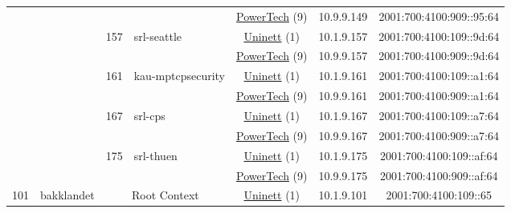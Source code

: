 \begin{small}
\begin{center}
\begin{longtable}{|c|c|c|c|c|c|c|c|}
  &  &  &  & \multicolumn{2}{|c|}{\tiny{\href{http://www.powertech.no}{PowerTech} (9)}} & \tiny{10.9.9.149} & \tiny{2001:700:4100:909::95:64} \\* \cline{3-3}\cline{4-4}\cline{5-5}\cline{6-6}\cline{7-7}\cline{8-8}
  &  & \multirow{2}{*}{\tiny{157}} & \multicolumn{1}{|l|}{\multirow{2}{*}{\tiny{srl-seattle}}} & \multicolumn{2}{|c|}{\tiny{\href{https://www.uninett.no}{Uninett} (1)}} & \tiny{10.1.9.157} & \tiny{2001:700:4100:109::9d:64} \\* \cline{5-5}\cline{6-6}\cline{7-7}\cline{8-8}
  &  &  &  & \multicolumn{2}{|c|}{\tiny{\href{http://www.powertech.no}{PowerTech} (9)}} & \tiny{10.9.9.157} & \tiny{2001:700:4100:909::9d:64} \\* \cline{3-3}\cline{4-4}\cline{5-5}\cline{6-6}\cline{7-7}\cline{8-8}
  &  & \multirow{2}{*}{\tiny{161}} & \multicolumn{1}{|l|}{\multirow{2}{*}{\tiny{kau-mptcpsecurity}}} & \multicolumn{2}{|c|}{\tiny{\href{https://www.uninett.no}{Uninett} (1)}} & \tiny{10.1.9.161} & \tiny{2001:700:4100:109::a1:64} \\* \cline{5-5}\cline{6-6}\cline{7-7}\cline{8-8}
  &  &  &  & \multicolumn{2}{|c|}{\tiny{\href{http://www.powertech.no}{PowerTech} (9)}} & \tiny{10.9.9.161} & \tiny{2001:700:4100:909::a1:64} \\* \cline{3-3}\cline{4-4}\cline{5-5}\cline{6-6}\cline{7-7}\cline{8-8}
  &  & \multirow{2}{*}{\tiny{167}} & \multicolumn{1}{|l|}{\multirow{2}{*}{\tiny{srl-cps}}} & \multicolumn{2}{|c|}{\tiny{\href{https://www.uninett.no}{Uninett} (1)}} & \tiny{10.1.9.167} & \tiny{2001:700:4100:109::a7:64} \\* \cline{5-5}\cline{6-6}\cline{7-7}\cline{8-8}
  &  &  &  & \multicolumn{2}{|c|}{\tiny{\href{http://www.powertech.no}{PowerTech} (9)}} & \tiny{10.9.9.167} & \tiny{2001:700:4100:909::a7:64} \\* \cline{3-3}\cline{4-4}\cline{5-5}\cline{6-6}\cline{7-7}\cline{8-8}
  &  & \multirow{2}{*}{\tiny{175}} & \multicolumn{1}{|l|}{\multirow{2}{*}{\tiny{srl-thuen}}} & \multicolumn{2}{|c|}{\tiny{\href{https://www.uninett.no}{Uninett} (1)}} & \tiny{10.1.9.175} & \tiny{2001:700:4100:109::af:64} \\* \cline{5-5}\cline{6-6}\cline{7-7}\cline{8-8}
  &  &  &  & \multicolumn{2}{|c|}{\tiny{\href{http://www.powertech.no}{PowerTech} (9)}} & \tiny{10.9.9.175} & \tiny{2001:700:4100:909::af:64} \\ \hline
 \multirow{22}{*}{\tiny{101}} & \multicolumn{1}{|l|}{\multirow{22}{*}{\tiny{bakklandet}}} & \multicolumn{2}{|c|}{\multirow{2}{*}{\tiny{Root Context}}} & \multicolumn{2}{|c|}{\tiny{\href{https://www.uninett.no}{Uninett} (1)}} & \tiny{10.1.9.101} & \tiny{2001:700:4100:109::65} \\* \cline{5-5}\cline{6-6}\cline{7-7}\cline{8-8}

\end{longtable}
\end{center}
\end{small}
